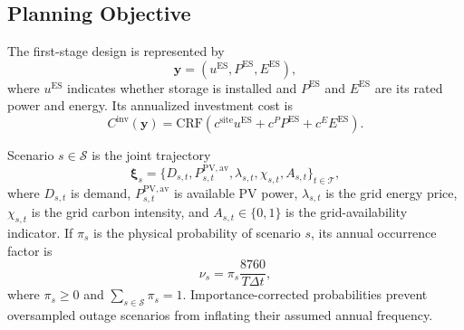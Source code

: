 \documentclass[times]{elsarticle}
\begin{document}
\subsection{Planning Objective}

The first-stage design is represented by
\begin{equation}
\bm y=(u^{\mathrm{ES}},P^{\mathrm{ES}},E^{\mathrm{ES}}),
\label{eq:design_vector}
\end{equation}
where $u^{\mathrm{ES}}$ indicates whether storage is installed and
$P^{\mathrm{ES}}$ and $E^{\mathrm{ES}}$ are its rated power and energy. Its
annualized investment cost is
\begin{equation}
C^{\mathrm{inv}}(\bm y)=\mathrm{CRF}
\left(c^{\mathrm{site}}u^{\mathrm{ES}}+c^P P^{\mathrm{ES}}
+c^E E^{\mathrm{ES}}\right).
\label{eq:investment}
\end{equation}

Scenario $s\in\mathcal S$ is the joint trajectory
\begin{equation}
\bm\xi_s=
\{D_{s,t},P^{\mathrm{PV,av}}_{s,t},\lambda_{s,t},\chi_{s,t},A_{s,t}\}_{t\in\mathcal T},
\label{eq:scenario}
\end{equation}
where $D_{s,t}$ is demand, $P^{\mathrm{PV,av}}_{s,t}$ is available PV power,
$\lambda_{s,t}$ is the grid energy price, $\chi_{s,t}$ is the grid carbon
intensity, and $A_{s,t}\in\{0,1\}$ is the grid-availability indicator. If
$\pi_s$ is the physical probability of scenario $s$, its annual occurrence
factor is
\begin{equation}
\nu_s=\pi_s\frac{8760}{T\Delta t},
\label{eq:annualization}
\end{equation}
where $\pi_s\ge0$ and $\sum_{s\in\mathcal S}\pi_s=1$. Importance-corrected
probabilities prevent oversampled outage scenarios from inflating their assumed
annual frequency.
\end{document}
